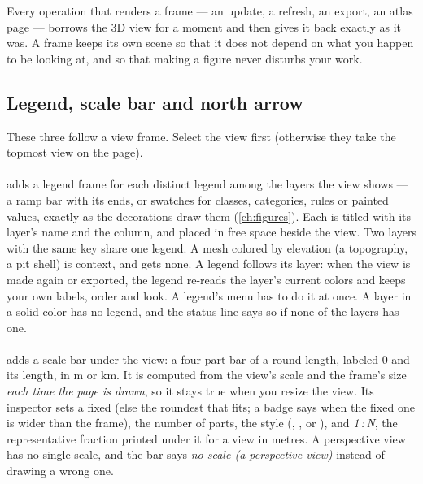 \begin{why}
Every operation that renders a frame — an update, a refresh, an export, an atlas page — borrows the 3D view for a moment and then gives it back exactly as it was. A frame keeps its own scene so that it does not depend on what you happen to be looking at, and so that making a figure never disturbs your work.
\end{why}

\subsection{Legend, scale bar and north arrow}

These three follow a view frame. Select the view first (otherwise they take the topmost view on the page).

\paragraph{} adds a legend frame for each distinct legend among the layers the view shows — a ramp bar with its ends, or swatches for classes, categories, rules or painted values, exactly as the decorations draw them (\cref{ch:figures}). Each is titled with its layer's name and the column, and placed in free space beside the view. Two layers with the same key share one legend. A mesh colored by elevation (a topography, a pit shell) is context, and gets none. A legend follows its layer: when the view is made again or exported, the legend re-reads the layer's current colors and keeps your own labels, order and look. A legend's menu has  to do it at once. A layer in a solid color has no legend, and the status line says so if none of the layers has one.

\paragraph{} adds a scale bar under the view: a four-part bar of a round length, labeled 0 and its length, in m or km. It is computed from the view's scale and the frame's size \emph{each time the page is drawn}, so it stays true when you resize the view. Its inspector sets a fixed  (else the roundest that fits; a badge says when the fixed one is wider than the frame), the number of parts, the style (, , or ), and \emph{1\,:\,N}, the representative fraction printed under it for a view in metres. A perspective view has no single scale, and the bar says \emph{no scale (a perspective view)} instead of drawing a wrong one.


